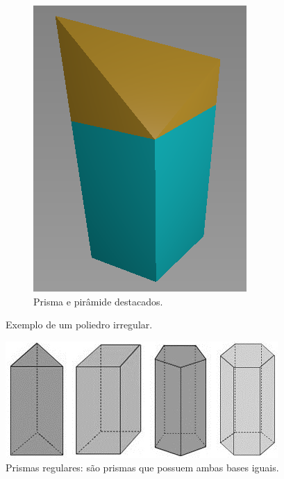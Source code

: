\begin{figure}[H]
\begin{subfigure}[t]{0.3\textwidth}
        \includegraphics[width=\textwidth]{dados/figuras/pol_sep.png}
        \caption{Prisma e pirâmide destacados.}
        \label{fig:polyhedron3}
    \end{subfigure}
    \caption{Exemplo de um poliedro irregular.}
    \label{fig:polyhedron}
\end{figure}

\begin{figure}[H]
    \centering
    \includegraphics[scale=0.8]{dados/figuras/regular_prisms.jpg}
    \caption{Prismas regulares: são prismas que possuem ambas bases iguais.}
    \label{fig:regular_prisms}
\end{figure}

